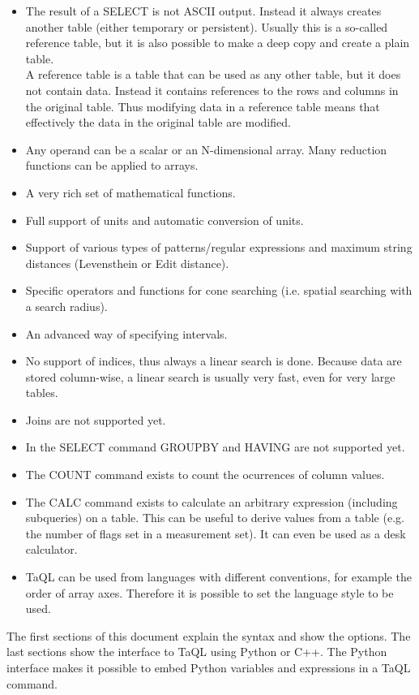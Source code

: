 \begin{itemize}
\item The result of a SELECT is not ASCII output. Instead it always
creates another table (either temporary or persistent). Usually this
is a so-called reference table, but it is also possible to make a deep
copy and create a plain table.
\\A reference table is a table that can be used as any other table,
but it does not contain data. Instead it contains references to the
rows and columns in the original table. Thus modifying data in a
reference table means that effectively the data in the original
table are modified.
\item Any operand can be a scalar or an N-dimensional array.
Many reduction functions can be applied to arrays.
\item A very rich set of mathematical functions.
\item Full support of units and automatic conversion of units.
\item Support of various types of patterns/regular expressions and
maximum string distances (Levensthein or Edit distance).
\item Specific operators and functions for cone searching
(i.e. spatial searching with a search radius).
\item An advanced way of specifying intervals.
\item No support of indices, thus always a linear search is done.
Because data are stored column-wise, a linear search is usually very
 fast, even for very large tables.
\item Joins are not supported yet.
\item In the SELECT command GROUPBY and HAVING are not supported yet.
\item The COUNT command exists to count the ocurrences of column values.
\item The CALC command exists to
calculate an arbitrary expression (including subqueries) on a
table. This can be useful to derive values from a table (e.g. the
number of flags set in a measurement set). It can even be used as a
desk calculator.
\item TaQL can be used from languages with different conventions, for
example the order of array axes. Therefore it is possible to set the
language style to be used.
\end{itemize}

The first sections of this document explain the syntax and show the options.
The last sections show the interface to TaQL using Python or C++.
The Python interface makes it possible to embed Python
variables and expressions in a TaQL command.

